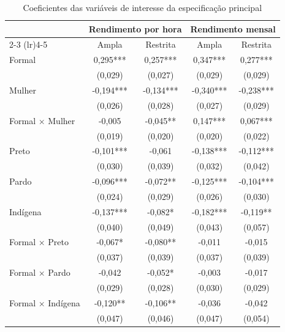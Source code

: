 \documentclass[12pt]{article}
\begin{document}
\begin{table}[htbp]
\centering
\caption{Coeficientes das variáveis de interesse da especificação principal}
\label{tab:apendice_a1}
\scriptsize
\begin{tabular}{lcccc}
\toprule
 & \multicolumn{2}{c}{Rendimento por hora} & \multicolumn{2}{c}{Rendimento mensal} \\
\cmidrule(lr){2-3} \cmidrule(lr){4-5}
 & Ampla & Restrita & Ampla & Restrita \\
\midrule

Formal
& 0,295***
& 0,257***
& 0,347***
& 0,277*** \\
&(0,029)
&(0,027)
&(0,029)
&(0,029) \\[0.3em]

Mulher
& -0,194***
& -0,134***
& -0,340***
& -0,238*** \\
&(0,026)
&(0,028)
&(0,027)
&(0,029) \\[0.3em]

Formal $\times$ Mulher
& -0,005
& -0,045**
& 0,147***
& 0,067*** \\
&(0,019)
&(0,020)
&(0,020)
&(0,022) \\[0.3em]

Preto
& -0,101***
& -0,061
& -0,138***
& -0,112*** \\
&(0,030)
&(0,039)
&(0,032)
&(0,042) \\[0.3em]

Pardo
& -0,096***
& -0,072**
& -0,125***
& -0,104*** \\
&(0,024)
&(0,029)
&(0,026)
&(0,030) \\[0.3em]

Ind\'igena
& -0,137***
& -0,082*
& -0,182***
& -0,119** \\
&(0,040)
&(0,049)
&(0,043)
&(0,057) \\[0.3em]

Formal $\times$ Preto
& -0,067*
& -0,080**
& -0,011
& -0,015 \\
&(0,037)
&(0,039)
&(0,037)
&(0,039) \\[0.3em]

Formal $\times$ Pardo
& -0,042
& -0,052*
& -0,003
& -0,017 \\
&(0,029)
&(0,028)
&(0,030)
&(0,029) \\[0.3em]

Formal $\times$ Ind\'igena
& -0,120**
& -0,106**
& -0,036
& -0,042 \\
&(0,047)
&(0,046)
&(0,047)
&(0,054) \\[0.3em]


\end{tabular}
\end{table}
\end{document}
